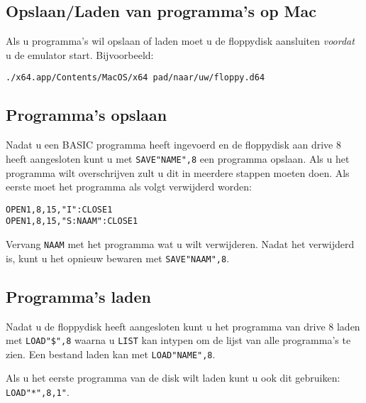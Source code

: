 \documentclass{article}
\begin{document}
\subsection{Opslaan/Laden van programma's op Mac}

Als u programma's wil opslaan of laden moet u de floppydisk aansluiten \emph{voordat} u de emulator start. Bijvoorbeeld:

\begin{lstlisting}
./x64.app/Contents/MacOS/x64 pad/naar/uw/floppy.d64
\end{lstlisting}

\subsection{Programma's opslaan}

Nadat u een BASIC programma heeft ingevoerd en de floppydisk aan drive 8 heeft aangesloten kunt u met \verb:SAVE"NAME",8: een programma opslaan.
Als u het programma wilt overschrijven zult u dit in meerdere stappen moeten doen.
Als eerste moet het programma als volgt verwijderd worden:

\begin{lstlisting}
OPEN1,8,15,"I":CLOSE1
OPEN1,8,15,"S:NAAM":CLOSE1
\end{lstlisting}

Vervang \verb:NAAM: met het programma wat u wilt verwijderen.
Nadat het verwijderd is, kunt u het opnieuw bewaren met \verb:SAVE"NAAM",8:.

\subsection{Programma's laden}

Nadat u de floppydisk heeft aangesloten kunt u het programma van drive 8 laden met \verb:LOAD"$",8: waarna u \verb:LIST: kan intypen om de lijst van alle programma's te zien.
Een bestand laden kan met \verb:LOAD"NAME",8:.

Als u het eerste programma van de disk wilt laden kunt u ook dit gebruiken: \verb:LOAD"*",8,1":.
\end{document}

